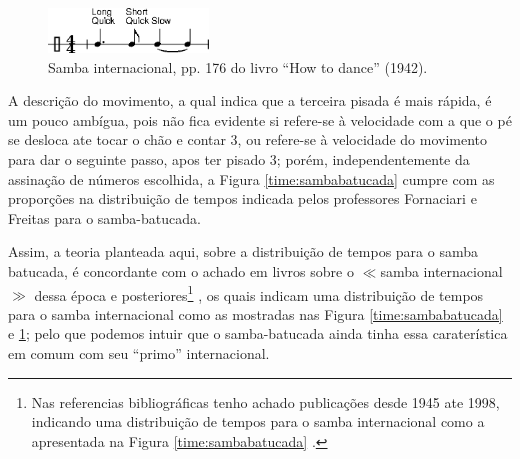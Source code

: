 \begin{itemize}
\parbox[t]{\dimexpr\textwidth-\leftmargin}{%
\begin{figure}
  \vspace{-10pt}
  \includegraphics[width=0.38\textwidth]{chapters/cap-historia-sambagafieira/samba-internacional-timming.eps}
  \caption{Samba internacional, pp. 176 do livro ``How to dance'' (1942).}
  \vspace{-10pt}
  \label{timming:samba-internacional:a}
\end{figure}
A descrição do movimento, a qual indica que a terceira pisada é mais rápida,
é um pouco ambígua, 
pois não fica evidente si refere-se à velocidade com a que o pé se desloca ate tocar o chão e contar 3,
ou refere-se à velocidade do movimento para dar o seguinte passo, apos ter pisado 3;
porém, 
independentemente da assinação de números escolhida, 
a Figura \ref{time:sambabatucada} cumpre com as proporções na distribuição de tempos 
indicada pelos professores Fornaciari e Freitas para o samba-batucada.
}
Assim, a teoria planteada aqui, sobre a distribuição de tempos para o samba batucada, 
é concordante com o achado em livros sobre o $\ll$samba internacional$\gg$  
dessa época e posteriores\footnote{Nas referencias bibliográficas tenho achado publicações desde 1945 ate 1998,
indicando uma distribuição de tempos para o samba internacional como a apresentada na Figura \ref{time:sambabatucada}
\cite[pp. 7,176]{wright1945dance} \cite[pp. 193]{white1953dancing} \cite[pp. 69]{stephenson1992complete} \cite[pp. 125]{harris1998social}.}
\cite[pp. 7,176]{wright1945dance} \cite[pp. 193]{white1953dancing} \cite[pp. 69]{stephenson1992complete} \cite[pp. 125]{harris1998social},
os quais indicam uma distribuição de tempos para o samba internacional como as mostradas nas Figura \ref{time:sambabatucada} e \ref{timming:samba-internacional:a};
pelo que podemos intuir que o samba-batucada ainda tinha essa caraterística em comum com seu ``primo'' internacional.

\end{itemize}
